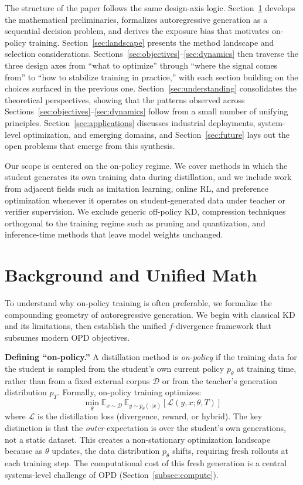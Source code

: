 \documentclass{article} %
\newcommand{\E}{\mathbb{E}}
\newcommand{\ptheta}{p_\theta}
\newcommand{\pteacher}{p_T}
\begin{document}
The structure of the paper follows the same design-axis logic. Section~\ref{sec:background} develops the mathematical preliminaries, formalizes autoregressive generation as a sequential decision problem, and derives the exposure bias that motivates on-policy training. Section~\ref{sec:landscape} presents the method landscape and selection considerations. Sections~\ref{sec:objectives}--\ref{sec:dynamics} then traverse the three design axes from ``what to optimize'' through ``where the signal comes from'' to ``how to stabilize training in practice,'' with each section building on the choices surfaced in the previous one. Section~\ref{sec:understanding} consolidates the theoretical perspectives, showing that the patterns observed across Sections~\ref{sec:objectives}--\ref{sec:dynamics} follow from a small number of unifying principles. Section~\ref{sec:applications} discusses industrial deployments, system-level optimization, and emerging domains, and Section~\ref{sec:future} lays out the open problems that emerge from this synthesis.

Our scope is centered on the on-policy regime. We cover methods in which the student generates its own training data during distillation, and we include work from adjacent fields such as imitation learning, online RL, and preference optimization whenever it operates on student-generated data under teacher or verifier supervision. We exclude generic off-policy KD, compression techniques orthogonal to the training regime such as pruning and quantization, and inference-time methods that leave model weights unchanged.

\section{Background and Unified Math}
\label{sec:background}

To understand why on-policy training is often preferable, we formalize the compounding geometry of autoregressive generation. We begin with classical KD and its limitations, then establish the unified $f$-divergence framework that subsumes modern OPD objectives.

\textbf{Defining ``on-policy.''} A distillation method is \emph{on-policy} if the training data for the student is sampled from the student's own current policy $\ptheta$ at training time, rather than from a fixed external corpus $\mathcal{D}$ or from the teacher's generation distribution $\pteacher$. Formally, on-policy training optimizes:
\begin{equation}
    \min_\theta \E_{x \sim \mathcal{D}}\, \E_{y \sim \ptheta(\cdot|x)} \left[ \mathcal{L}(y, x; \theta, T) \right]
\end{equation}
where $\mathcal{L}$ is the distillation loss (divergence, reward, or hybrid). The key distinction is that the \emph{outer} expectation is over the student's own generations, not a static dataset. This creates a non-stationary optimization landscape because as $\theta$ updates, the data distribution $\ptheta$ shifts, requiring fresh rollouts at each training step. The computational cost of this fresh generation is a central systems-level challenge of OPD (Section~\ref{subsec:compute}).
\end{document}
